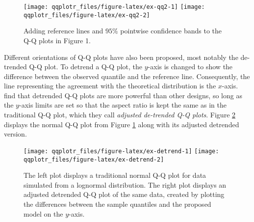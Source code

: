 \begin{Schunk}
\begin{figure}

{\centering \texttt{[image: qqplotr\_files/figure-latex/ex-qq2-1]} \texttt{[image: qqplotr\_files/figure-latex/ex-qq2-2]} 

}

\caption[Adding reference lines and $95\%$ pointwise confidence bands to the Q-Q plots in Figure 1]{Adding reference lines and $95\%$ pointwise confidence bands to the Q-Q plots in Figure 1.}\label{fig:ex-qq2}
\end{figure}
\end{Schunk}

Different orientations of Q-Q plots have also been proposed, most
notably the de-trended Q-Q plot. To detrend a Q-Q plot, the \(y\)-axis
is changed to show the difference between the observed quantile and the
reference line. Consequently, the line representing the agreement with
the theoretical distribution is the \(x\)-axis. \citet{Loy2016-fg} find
that detrended Q-Q plots are more powerful than other designs, so long
as the \(y\)-axis limits are set so that the aspect ratio is kept the
same as in the traditional Q-Q plot, which they call \emph{adjusted
de-trended Q-Q plots}. Figure \ref{fig:ex-detrend} displays the normal
Q-Q plot from Figure \ref{fig:ex-qq2} along with its adjusted detrended
version.

\begin{Schunk}
\begin{figure}

{\centering \texttt{[image: qqplotr\_files/figure-latex/ex-detrend-1]} \texttt{[image: qqplotr\_files/figure-latex/ex-detrend-2]} 

}

\caption[The left plot displays a traditional normal Q-Q plot for data simulated from a lognormal distribution]{The left plot displays a traditional normal Q-Q plot for data simulated from a lognormal distribution. The right plot displays an adjusted detrended Q-Q plot of the same data, created by plotting the differences between the sample quantiles and the proposed model on the $y$-axis.}\label{fig:ex-detrend}
\end{figure}
\end{Schunk}

